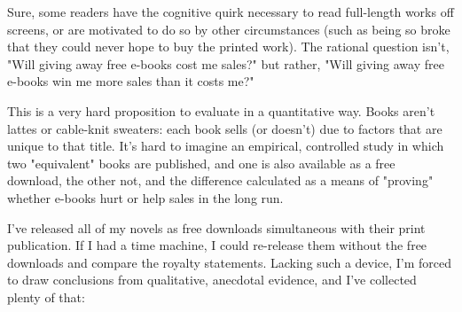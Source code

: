 Sure, some readers have the cognitive quirk necessary to read
full-length works off screens, or are motivated to do so by other
circumstances (such as being so broke that they could never hope to
buy the printed work). The rational question isn't, "Will giving
away free e-books cost me sales?" but rather, "Will giving away
free e-books win me more sales than it costs me?"

This is a very hard proposition to evaluate in a quantitative way.
Books aren't lattes or cable-knit sweaters: each book sells (or
doesn't) due to factors that are unique to that title. It's hard to
imagine an empirical, controlled study in which two "equivalent"
books are published, and one is also available as a free download,
the other not, and the difference calculated as a means of
"proving" whether e-books hurt or help sales in the long run.

I've released all of my novels as free downloads simultaneous with
their print publication. If I had a time machine, I could
re-release them without the free downloads and compare the royalty
statements. Lacking such a device, I'm forced to draw conclusions
from qualitative, anecdotal evidence, and I've collected plenty of
that:

